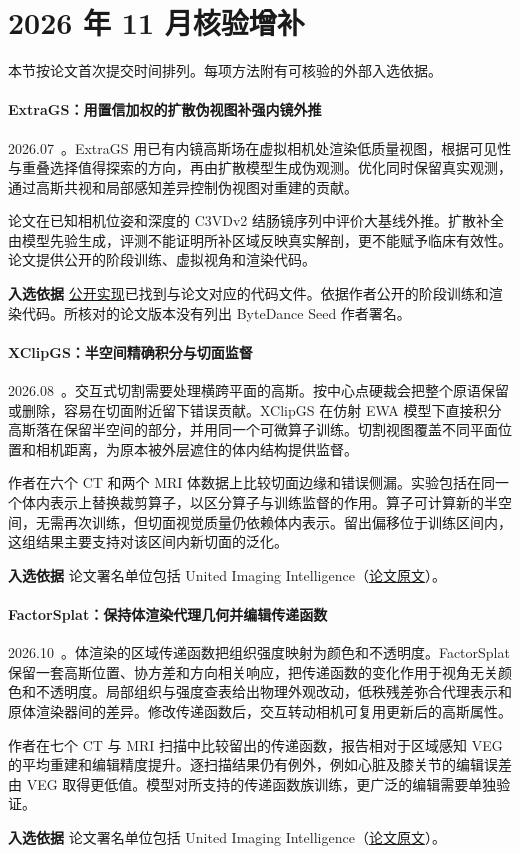 \section{2026 年 11 月核验增补}

本节按论文首次提交时间排列。每项方法附有可核验的外部入选依据。

\paragraph{ExtraGS：用置信加权的扩散伪视图补强内镜外推}
2026.07~\cite{2607_12785}。ExtraGS 用已有内镜高斯场在虚拟相机处渲染低质量视图，根据可见性与重叠选择值得探索的方向，再由扩散模型生成伪观测。优化同时保留真实观测，通过高斯共视和局部感知差异控制伪视图对重建的贡献。

论文在已知相机位姿和深度的 C3VDv2 结肠镜序列中评价大基线外推。扩散补全由模型先验生成，评测不能证明所补区域反映真实解剖，更不能赋予临床有效性。论文提供公开的阶段训练、虚拟视角和渲染代码。

\textbf{入选依据} \href{https://github.com/IRMVLab/ExtraGS}{公开实现}已找到与论文对应的代码文件。依据作者公开的阶段训练和渲染代码。所核对的论文版本没有列出 ByteDance Seed 作者署名。

\paragraph{XClipGS：半空间精确积分与切面监督}
2026.08~\cite{2608_07760}。交互式切割需要处理横跨平面的高斯。按中心点硬裁会把整个原语保留或删除，容易在切面附近留下错误贡献。XClipGS 在仿射 EWA 模型下直接积分高斯落在保留半空间的部分，并用同一个可微算子训练。切割视图覆盖不同平面位置和相机距离，为原本被外层遮住的体内结构提供监督。

作者在六个 CT 和两个 MRI 体数据上比较切面边缘和错误侧漏。实验包括在同一个体内表示上替换裁剪算子，以区分算子与训练监督的作用。算子可计算新的半空间，无需再次训练，但切面视觉质量仍依赖体内表示。留出偏移位于训练区间内，这组结果主要支持对该区间内新切面的泛化。

\textbf{入选依据} 论文署名单位包括 United Imaging Intelligence（\href{https://arxiv.org/abs/2608.07760}{论文原文}）。

\paragraph{FactorSplat：保持体渲染代理几何并编辑传递函数}
2026.10~\cite{2610_02382}。体渲染的区域传递函数把组织强度映射为颜色和不透明度。FactorSplat 保留一套高斯位置、协方差和方向相关响应，把传递函数的变化作用于视角无关颜色和不透明度。局部组织与强度查表给出物理外观改动，低秩残差弥合代理表示和原体渲染器间的差异。修改传递函数后，交互转动相机可复用更新后的高斯属性。

作者在七个 CT 与 MRI 扫描中比较留出的传递函数，报告相对于区域感知 VEG 的平均重建和编辑精度提升。逐扫描结果仍有例外，例如心脏及膝关节的编辑误差由 VEG 取得更低值。模型对所支持的传递函数族训练，更广泛的编辑需要单独验证。

\textbf{入选依据} 论文署名单位包括 United Imaging Intelligence（\href{https://arxiv.org/abs/2610.02382}{论文原文}）。
